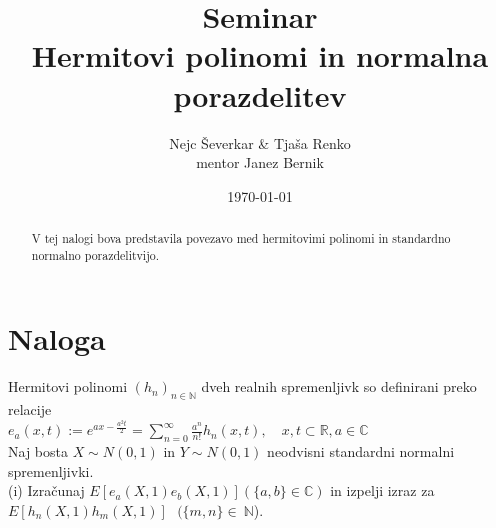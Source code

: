 \documentclass[ letterpaper, titlepage, fleqn]{article}
\begin{document}
\title{Seminar \\ Hermitovi polinomi in normalna porazdelitev}
\author{Nejc Ševerkar \& Tjaša Renko \\ mentor Janez Bernik}
\date{\today}
\maketitle

\begin{abstract}
V tej nalogi bova predstavila povezavo med hermitovimi polinomi
in standardno normalno porazdelitvijo.
\end{abstract}

\section*{Naloga}
Hermitovi polinomi $(h_n)_{n \in \mathbb{N}}$ dveh realnih spremenljivk
so definirani preko relacije \\[10px]
$e_a(x, t) := e^{ax -\frac{a^2t}{2}} = \sum_{n=0}^{\infty} \frac{a^n}{n!} h_n(x, t), 
\quad {x, t} \subset \mathbb{R}, a \in \mathbb{C}$ \\[10px]
Naj bosta $X \sim N(0, 1)$ in $Y \sim N(0, 1)$ neodvisni standardni normalni spremenljivki. \\[10px]
(i) Izračunaj $E[e_a(X,1) e_b(X,1)] (\{a,b\} \in \mathbb{C}) $ in izpelji izraz za $ E[h_n(X,1) h_m(X,1)] \text{ } (\{m,n\}\in ~ \mathbb{N} $).\\
\end{document}
